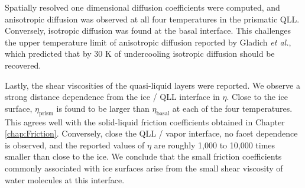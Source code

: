 Spatially resolved one dimensional diffusion coefficients were
computed, and anisotropic diffusion was observed at all four
temperatures in the prismatic QLL. Conversely, isotropic diffusion was
found at the basal interface. This challenges the upper temperature
limit of anisotropic diffusion reported by Gladich \textit{et al.},
which predicted that by 30 K of undercooling isotropic diffusion
should be recovered.\cite{Gladich2011,Gladich2012}

Lastly, the shear viscosities of the quasi-liquid layers were
reported. We observe a strong distance dependence from the ice / QLL
interface in $\eta$. Close to the ice surface, $\eta_{\mathrm{prism}}$
is found to be larger than $\eta_{\mathrm{basal}}$ at each of the four
temperatures. This agrees well with the solid-liquid friction
coefficients obtained in Chapter \ref{chap:Friction}. Conversely,
close the QLL / vapor interface, no facet dependence is observed, and
the reported values of $\eta$ are roughly 1,000 to 10,000 times smaller
than close to the ice. We conclude that the small friction
coefficients commonly associated with ice surfaces arise from the
small shear viscosity of water molecules at this interface. 